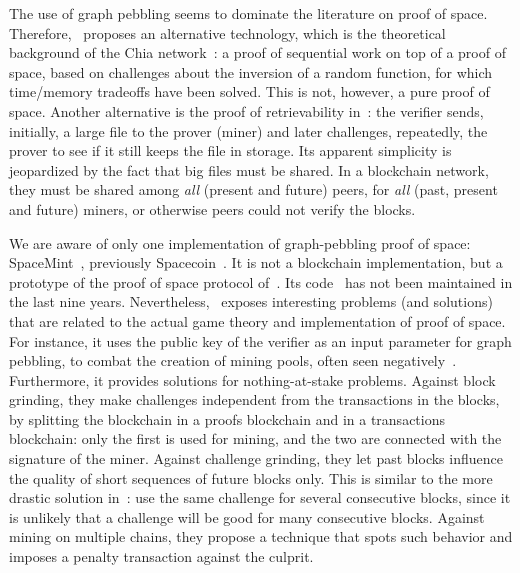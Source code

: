 The use of graph pebbling seems to dominate the literature on proof of space.
Therefore, \cite{AbusalahACKPR17}~proposes an alternative technology, which is the
theoretical background of the Chia network~\cite{CohenP19,Chia}:
a proof of sequential work on top of a proof of space, based on challenges
about the inversion of a random function, for which time/memory tradeoffs have been solved.
This is not, however, a pure proof of space.
Another alternative is the proof of retrievability in~\cite{JuelsK07}: the verifier sends, initially,
a large file to the prover (miner) and later challenges, repeatedly, the prover to see
if it still keeps the file in storage. Its apparent simplicity
is jeopardized by the fact that big files must be shared.
In a blockchain network, they must be shared among \emph{all} (present and future)
peers, for \emph{all} (past, present and future) miners, or otherwise peers could not verify the blocks.

We are aware of only one implementation of graph-pebbling proof of space:
SpaceMint~\cite{ParkKFGAP18}, previously Spacecoin~\cite{ParkPAFG15}.
It is not a blockchain implementation,
but a prototype of the proof of space protocol of~\cite{DziembowskiFKP15}.
Its code~\cite{SpaceMintCode} has not been maintained in the last nine years.
Nevertheless, \cite{ParkKFGAP18}~exposes interesting problems (and solutions)
that are related to the actual game theory and implementation of proof of space.
For instance, it uses the public key of the verifier as an input parameter
for graph pebbling, to combat the creation of mining pools, often seen
negatively~\cite{MillerKKS15}.
Furthermore, it provides solutions for nothing-at-stake problems. Against block grinding,
they make challenges independent from the transactions in the blocks, by splitting the
blockchain in a proofs blockchain and in a transactions blockchain: only the first is used for mining,
and the two are connected with the signature of the miner.
Against challenge grinding, they let past blocks influence the quality of short sequences
of future blocks only. This is similar to the more drastic solution in~\cite{CohenP19}:
use the same challenge for several consecutive blocks,
since it is unlikely that a challenge will be good for many consecutive blocks.
Against mining on multiple chains, they propose a technique that spots such behavior and
imposes a penalty transaction against the culprit.

